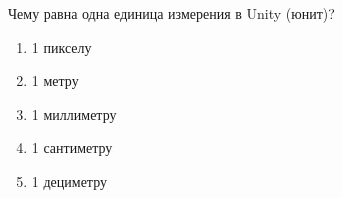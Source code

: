 
Чему равна одна единица измерения в Unity (юнит)?

\begin{enumerate}
    \item 1 пикселу
    \item 1 метру
    \item 1 миллиметру
    \item 1 сантиметру
    \item 1 дециметру
\end{enumerate}

